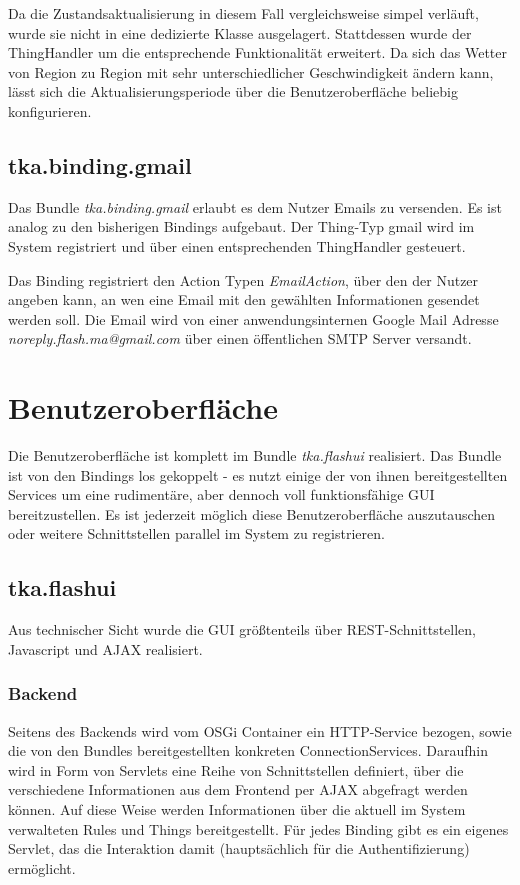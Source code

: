 Da die Zustandsaktualisierung in diesem Fall vergleichsweise simpel verläuft, wurde sie nicht in eine dedizierte Klasse ausgelagert. Stattdessen wurde der ThingHandler um die entsprechende Funktionalität erweitert. Da sich das Wetter von Region zu Region mit sehr unterschiedlicher Geschwindigkeit ändern kann, lässt sich die Aktualisierungsperiode über die Benutzeroberfläche beliebig konfigurieren.


\subsection{tka.binding.gmail}
Das Bundle \textit{tka.binding.gmail} erlaubt es dem Nutzer Emails zu versenden. Es ist analog zu den bisherigen Bindings aufgebaut. Der Thing-Typ \glqq gmail\grqq{} wird im System registriert und über einen entsprechenden ThingHandler gesteuert. 

Das Binding registriert den Action Typen \textit{EmailAction}, über den der Nutzer angeben kann, an wen eine Email mit den gewählten Informationen gesendet werden soll. Die Email wird von einer anwendungsinternen Google Mail\cite{gmail} Adresse \textit{noreply.flash.ma@gmail.com} über einen öffentlichen SMTP Server versandt.



\section{Benutzeroberfläche}
Die Benutzeroberfläche ist komplett im Bundle \textit{tka.flashui} realisiert. Das Bundle ist von den Bindings los gekoppelt - es nutzt einige der von ihnen bereitgestellten Services um eine rudimentäre, aber dennoch voll funktionsfähige GUI bereitzustellen. Es ist jederzeit möglich diese Benutzeroberfläche auszutauschen oder weitere Schnittstellen parallel im System zu registrieren.


\subsection{tka.flashui}
Aus technischer Sicht wurde die GUI größtenteils über REST-Schnittstellen, Javascript und AJAX realisiert.

\subsubsection{Backend}
Seitens des Backends wird vom OSGi Container ein HTTP-Service bezogen, sowie die von den Bundles bereitgestellten konkreten ConnectionServices. Daraufhin wird in Form von Servlets eine Reihe von Schnittstellen definiert, über die verschiedene Informationen aus dem Frontend per AJAX abgefragt werden können. Auf diese Weise werden Informationen über die aktuell im System verwalteten Rules und Things bereitgestellt. Für jedes Binding gibt es ein eigenes Servlet, das die Interaktion damit (hauptsächlich für die Authentifizierung) ermöglicht. 

